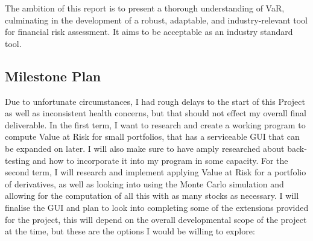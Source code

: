 \documentclass{article}
\begin{document}
The ambition of this report is to present a thorough understanding of VaR, culminating in the development of a robust, adaptable, and industry-relevant tool for financial risk assessment. It aims to be acceptable as an industry standard tool. 
  
\subsection{Milestone Plan}
Due to unfortunate circumstances, I had rough delays to the start of this Project as well as inconsistent health concerns, but that should not effect my overall final deliverable. In the first term, I want to research and create a working program to compute Value at Risk for small portfolios, that has a serviceable GUI that can be expanded on later. I will also make sure to have amply researched about back-testing and how to incorporate it into my program in some capacity. For the second term, I will research and implement applying Value at Risk for a portfolio of derivatives, as well as looking into using the Monte Carlo simulation and allowing for the computation of all this with as many stocks as necessary. I will finalise the GUI and plan to look into completing some of the extensions provided for the project, this will depend on the overall developmental scope of the project at the time, but these are the options I would be willing to explore:
\end{document}
